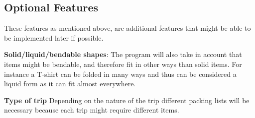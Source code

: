 \subsection{Optional Features}
These features as mentioned above, are additional features that might be able to be implemented later if possible.\newline

\textbf{Solid/liquid/bendable shapes}:
The program will also take in account that items might be bendable, and therefore fit in other ways than solid items. For instance a T-shirt can be folded in many ways and thus can be considered a liquid form as it can fit almost everywhere.
\newline

\textbf{Type of trip}
Depending on the nature of the trip different packing lists will be necessary because each trip might require different items.
\newline
